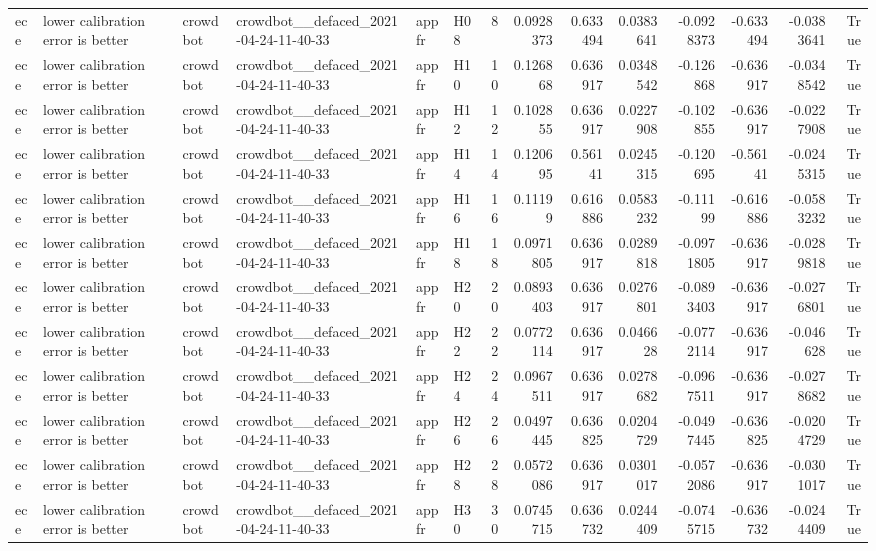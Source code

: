 \begin{longtable}{llllllrrrrrrrr}
ece & lower calibration error is better & crowdbot & crowdbot\_\_defaced\_2021-04-24-11-40-33 & appfr & H08 & 8 & 0.0928373 & 0.633494 & 0.0383641 & -0.0928373 & -0.633494 & -0.0383641 & True \\
ece & lower calibration error is better & crowdbot & crowdbot\_\_defaced\_2021-04-24-11-40-33 & appfr & H10 & 10 & 0.126868 & 0.636917 & 0.0348542 & -0.126868 & -0.636917 & -0.0348542 & True \\
ece & lower calibration error is better & crowdbot & crowdbot\_\_defaced\_2021-04-24-11-40-33 & appfr & H12 & 12 & 0.102855 & 0.636917 & 0.0227908 & -0.102855 & -0.636917 & -0.0227908 & True \\
ece & lower calibration error is better & crowdbot & crowdbot\_\_defaced\_2021-04-24-11-40-33 & appfr & H14 & 14 & 0.120695 & 0.56141 & 0.0245315 & -0.120695 & -0.56141 & -0.0245315 & True \\
ece & lower calibration error is better & crowdbot & crowdbot\_\_defaced\_2021-04-24-11-40-33 & appfr & H16 & 16 & 0.11199 & 0.616886 & 0.0583232 & -0.11199 & -0.616886 & -0.0583232 & True \\
ece & lower calibration error is better & crowdbot & crowdbot\_\_defaced\_2021-04-24-11-40-33 & appfr & H18 & 18 & 0.0971805 & 0.636917 & 0.0289818 & -0.0971805 & -0.636917 & -0.0289818 & True \\
ece & lower calibration error is better & crowdbot & crowdbot\_\_defaced\_2021-04-24-11-40-33 & appfr & H20 & 20 & 0.0893403 & 0.636917 & 0.0276801 & -0.0893403 & -0.636917 & -0.0276801 & True \\
ece & lower calibration error is better & crowdbot & crowdbot\_\_defaced\_2021-04-24-11-40-33 & appfr & H22 & 22 & 0.0772114 & 0.636917 & 0.046628 & -0.0772114 & -0.636917 & -0.046628 & True \\
ece & lower calibration error is better & crowdbot & crowdbot\_\_defaced\_2021-04-24-11-40-33 & appfr & H24 & 24 & 0.0967511 & 0.636917 & 0.0278682 & -0.0967511 & -0.636917 & -0.0278682 & True \\
ece & lower calibration error is better & crowdbot & crowdbot\_\_defaced\_2021-04-24-11-40-33 & appfr & H26 & 26 & 0.0497445 & 0.636825 & 0.0204729 & -0.0497445 & -0.636825 & -0.0204729 & True \\
ece & lower calibration error is better & crowdbot & crowdbot\_\_defaced\_2021-04-24-11-40-33 & appfr & H28 & 28 & 0.0572086 & 0.636917 & 0.0301017 & -0.0572086 & -0.636917 & -0.0301017 & True \\
ece & lower calibration error is better & crowdbot & crowdbot\_\_defaced\_2021-04-24-11-40-33 & appfr & H30 & 30 & 0.0745715 & 0.636732 & 0.0244409 & -0.0745715 & -0.636732 & -0.0244409 & True \\

\end{longtable}
